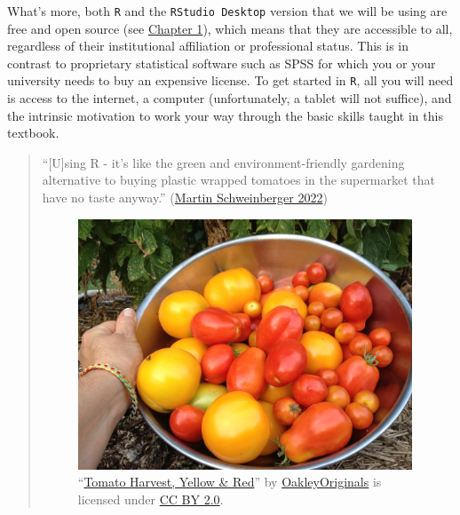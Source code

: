 \documentclass[
  letterpaper,
  DIV=11,
  numbers=noendperiod,
  oneside]{scrreprt}
\begin{document}
What's more, both \texttt{R} and the \texttt{RStudio\ Desktop} version
that we will be using are free and open source (see
\href{https://elenlefoll.github.io/RstatsTextbook/OpenScholarship.html}{Chapter
1}), which means that they are accessible to all, regardless of their
institutional affiliation or professional status. This is in contrast to
proprietary statistical software such as SPSS for which you or your
university needs to buy an expensive license. To get started in
\texttt{R}, all you will need is access to the internet, a computer
(unfortunately, a tablet will not suffice), and the intrinsic motivation
to work your way through the basic skills taught in this textbook.

\begin{quote}
``{[}U{]}sing R - it's like the green and environment-friendly gardening
alternative to buying plastic wrapped tomatoes in the supermarket that
have no taste anyway.''
(\href{https://slcladal.github.io/whyr.html}{Martin Schweinberger 2022})

\begin{figure}

\includegraphics[width=3.91667in,height=\textheight]{images/TomatoHarvest.jpg}

\caption{\label{fig-tomatoes}``\href{https://www.flickr.com/photos/47264866@N00/9455141053}{Tomato
Harvest, Yellow \& Red}'' by
\href{https://www.flickr.com/photos/47264866@N00}{OakleyOriginals} is
licensed under
\href{https://creativecommons.org/licenses/by/2.0/?ref=openverse}{CC BY
2.0}.}

\end{figure}%
\end{quote}
\end{document}
